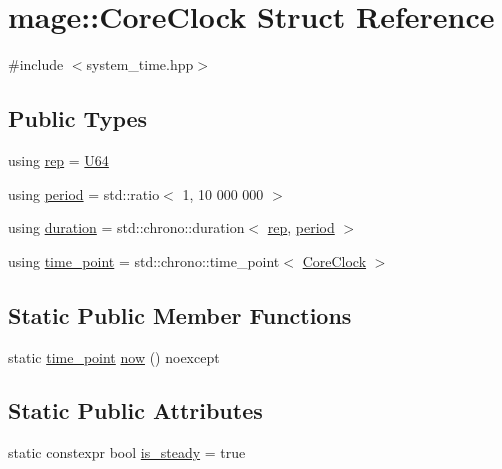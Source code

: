 \hypertarget{structmage_1_1_core_clock}{}\section{mage\+:\+:Core\+Clock Struct Reference}
\label{structmage_1_1_core_clock}


{\ttfamily \#include $<$system\+\_\+time.\+hpp$>$}

\subsection*{Public Types}
\begin{DoxyCompactItemize}
\item 
using \hyperlink{structmage_1_1_core_clock_afcf2ac7e5e594734cdedaf46fbbf23d8}{rep} = \hyperlink{namespacemage_a6672cf3c861707ce4a3235a3eb43941d}{U64}
\item 
using \hyperlink{structmage_1_1_core_clock_af147d1abde62f8694d3be69b8915ddbc}{period} = std\+::ratio$<$ 1, 10 \textquotesingle{}000 \textquotesingle{}000 $>$
\item 
using \hyperlink{structmage_1_1_core_clock_aebf1d2eafc4269bd84c1386114f3e6cb}{duration} = std\+::chrono\+::duration$<$ \hyperlink{structmage_1_1_core_clock_afcf2ac7e5e594734cdedaf46fbbf23d8}{rep}, \hyperlink{structmage_1_1_core_clock_af147d1abde62f8694d3be69b8915ddbc}{period} $>$
\item 
using \hyperlink{structmage_1_1_core_clock_a1ea0193dea9647827d27469ec9e3b61c}{time\+\_\+point} = std\+::chrono\+::time\+\_\+point$<$ \hyperlink{structmage_1_1_core_clock}{Core\+Clock} $>$
\end{DoxyCompactItemize}
\subsection*{Static Public Member Functions}
\begin{DoxyCompactItemize}
\item 
static \hyperlink{structmage_1_1_core_clock_a1ea0193dea9647827d27469ec9e3b61c}{time\+\_\+point} \hyperlink{structmage_1_1_core_clock_addea160814d296009c10986faabe08bd}{now} () noexcept
\end{DoxyCompactItemize}
\subsection*{Static Public Attributes}
\begin{DoxyCompactItemize}
\item 
static constexpr bool \hyperlink{structmage_1_1_core_clock_ae6481fa7adddf1e9fefd45fba2e20516}{is\+\_\+steady} = true
\end{DoxyCompactItemize}


